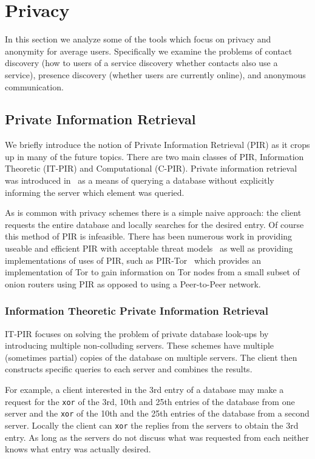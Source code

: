 \section{Privacy}\label{sec:priv}
In this section we analyze some of the tools which focus on privacy and
anonymity for average users. Specifically we examine the problems of contact
discovery (how to users of a service discovery whether contacts also use a
service), presence discovery (whether users are currently online), and anonymous
communication.

\subsection{Private Information Retrieval}\label{ssec:PIR}
We briefly introduce the notion of Private Information Retrieval (PIR) as it
crops up in many of the future topics. There are two main classes of PIR,
Information Theoretic (IT-PIR) and Computational (C-PIR). Private information
retrieval was introduced in~\cite{chor1995private} as a means of querying a
database without explicitly informing the server which element was queried.

As is common with privacy schemes there is a simple naive approach: the client
requests the entire database and locally searches for the desired entry. Of
course this method of PIR is infeasible. There has been numerous work in
providing useable and efficient PIR with acceptable threat
models~\cite{aguilar2016xpir,devet2012optimally,beimel2002robust} as well as
providing implementations of uses of PIR, such as PIR-Tor~\cite{mittal2011pir}
which provides an implementation of Tor to gain information on Tor nodes from a
small subset of onion routers using PIR as opposed to using a Peer-to-Peer
network.

\subsubsection{Information Theoretic Private Information Retrieval}
IT-PIR focuses on solving the problem of private database look-ups by
introducing multiple non-colluding servers. These schemes have multiple
(sometimes partial) copies of the database on multiple servers. The client then
constructs specific queries to each server and combines the results.

For example, a client interested in the 3rd entry of a database may make a
request for the \texttt{xor} of the 3rd, 10th and 25th entries of the database
from one server and the \texttt{xor} of the 10th and the 25th entries of the
database from a second server. Locally the client can \texttt{xor} the  replies
from the servers to obtain the 3rd entry. As long as the servers do not discuss
what was requested from each neither knows what entry was actually desired.

